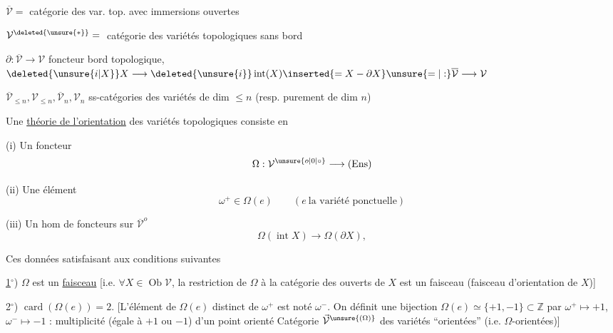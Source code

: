 $\overline{\mathcal V}={}$ catégorie des var. top.  avec immersions ouvertes

$\mathcal V^{\deleted{\unsure{*}}}={}$ catégorie des variétés topologiques sans bord

$\partial:\overline{\mathcal V}\longrightarrow\mathcal V$ foncteur bord topologique, $\deleted{\unsure{i|X}}X\longrightarrow\deleted{\unsure{i}}\operatorname{int}(X)\inserted{=X-\partial X}\unsure{=|:}\overline{\mathcal V}\longrightarrow\mathcal V$ 

$\overline{\mathcal V}_{\leq n},\mathcal V_{\leq n},\overline{\mathcal V}_n,\mathcal V_n$ ss-catégories des variétés de dim $\leq n$ (resp. purement de dim $n$)

Une \uline{théorie de l'orientation} des variétés topologiques consiste en

(i) Un foncteur
\[
\Omega:\mathcal V^{\unsure{o|0|\circ}}\longrightarrow(\mathrm{Ens})
\]

(ii) Une  élément 
\[
\omega^+\in\Omega(e)\qquad(e\ \text{la variété ponctuelle})
\]

(iii)  Un hom de foncteurs sur $\overline{\mathcal V}^{o}$
\[
\Omega(\operatorname{int}X)\longrightarrow\Omega(\partial X),
\]

Ces données satisfaisant aux conditions suivantes

\uline{1}$^\circ$) $\Omega$ est un \uline{faisceau} [i.e. $\forall X\in\operatorname{Ob}\mathcal V$, la restriction  de $\Omega$ à la catégorie des ouverts de $X$ est un faisceau \unsure{$\}$} (faisceau d'orientation de $X$)]

2$^\circ$) $\operatorname{card}(\Omega(e))=2$. [L'élément de $\Omega(e)$ distinct de $\omega^+$ est noté $\omega^-$. On définit une bijection $\Omega(e)\simeq\{+1,-1\}\subset\mathbb Z$ par $\omega^+\mapsto+1$, $\omega^-\mapsto-1$ : multiplicité (égale à $+1$ ou $-1$) d'un point orienté Catégorie $\vec{\mathcal V}^{\unsure{(\Omega)}}$ des variétés  ``orientées'' (i.e. $\Omega$-orientées)]

